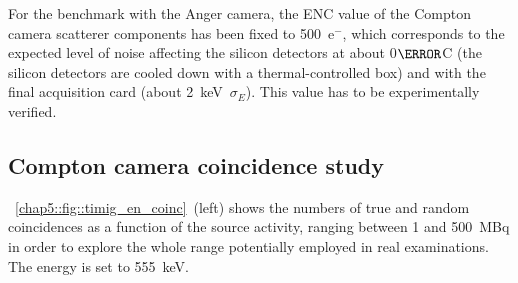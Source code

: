 For the benchmark with the Anger camera, the ENC value of the Compton camera scatterer components has been fixed to 500~e$^-$, which corresponds to the expected level of noise affecting the silicon detectors at about 0$\degree$C (the silicon detectors are cooled down with a thermal-controlled box) and with the final acquisition card (about 2~keV~$\sigma_{E}$). This value has to be experimentally verified.

\subsection{Compton camera coincidence study}\label{chap5::sec::Results_CC_SPECT_coinc}
\figurename~\ref{chap5::fig::timig_en_coinc}~(left) shows the numbers of true and random coincidences as a function of the source activity, ranging between 1 and 500~MBq in order to explore the whole range potentially employed in real examinations. The energy is set to 555~keV.  

